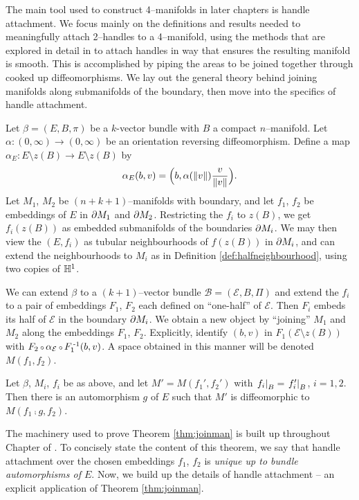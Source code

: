 The main tool used to construct 4--manifolds in later chapters is handle attachment.
We focus mainly on the definitions and results needed to meaningfully attach 2--handles to a 4--manifold, using the methods that are explored in detail in \cite{Kosi93} to attach handles in way that ensures the resulting manifold is smooth.
This is accomplished by piping the areas to be joined together through cooked up diffeomorphisms.
We lay out the general theory behind joining manifolds along submanifolds of the boundary, then move into the specifics of handle attachment.

Let $\beta=(E,B,\pi)$ be a $k$-vector bundle with $B$ a compact $n$--manifold.
Let $\alpha:(0,\infty)\to(0,\infty)$ be an orientation reversing diffeomorphism.
Define a map $\alpha_E: E\setminus z(B) \to E\setminus z(B)$ by
\begin{equation}
	\label{eqn:alpha}
	\alpha_E(b,v) = \Big(b,\alpha(\left\lVert v \right\rVert)\frac{v}{\left\lVert v \right\rVert}\Big).
\end{equation}
Let $M_1$, $M_2$ be $(n+k+1)$--manifolds with boundary, and let $f_1$, $f_2$ be embeddings of $E$ in $\partial M_1$ and $\partial M_2$.
Restricting the $f_i$ to $z(B)$, we get $f_i(z(B))$ as embedded submanifolds of the boundaries $\partial M_i$.
We may then view the $(E,f_i)$ as tubular neighbourhoods of $f(z(B))$ in $\partial M_i$, and can extend the neighbourhoods to $M_i$ as in Definition \ref{def:halfneighbourhood}, using two copies of $\mathbb{H}^1$.

We can extend $\beta$ to a $(k+1)$--vector bundle $\mathcal{B}=(\mathcal{E},B,\Pi)$ and extend the $f_i$ to a pair of embeddings $F_1$, $F_2$ each defined on ``one-half'' of $\mathcal{E}$.
Then $F_i$ embeds its half of $\mathcal{E}$ in the boundary $\partial M_i$.
We obtain a new object by ``joining'' $M_1$ and $M_2$ along the embeddings $F_1$, $F_2$.
Explicitly, identify $(b,v)$ in $F_1(\mathcal{E}\setminus z(B))$ with $F_2\comp \alpha_\mathcal{E}\comp F_1\inv(b,v)$.
A space obtained in this manner will be denoted $M(f_1,f_2)$.

\begin{theorem}
	\label{thm:joinman}
	Let $\beta$, $M_i$, $f_i$ be as above, and let $M'=M(f_1',f_2')$ with $\left.f_i\right|_{B}=\left.f_i'\right|_{B}$, $i=1,2$.
	Then there is an automorphism $g$ of $E$ such that $M'$ is diffeomorphic to $M(f_1\comp g,f_2)$.
\end{theorem}

The machinery used to prove Theorem \ref{thm:joinman} is built up throughout Chapter  of \cite{Kosi93}.
To concisely state the content of this theorem, we say that handle attachment over the chosen embeddings $f_1$, $f_2$ is \emph{unique up to bundle automorphisms of $E$}.
Now, we build up the details of handle attachment -- an explicit application of Theorem \ref{thm:joinman}.

